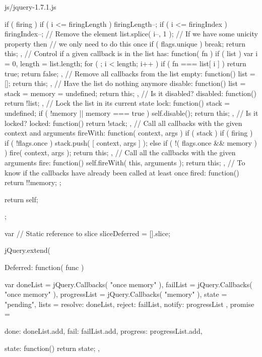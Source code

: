 \documentclass{article}
\begin{document}
\begin{chunk}{js/jquery-1.7.1.js}
{{{{{{{{								if ( firing ) {
									if ( i <= firingLength ) {
										firingLength--;
										if ( i <= firingIndex ) {
											firingIndex--;
										}
									}
								}
								// Remove the element
								list.splice( i--, 1 );
								// If we have some unicity property then
								// we only need to do this once
								if ( flags.unique ) {
									break;
								}
							}
						}
					}
				}
				return this;
			},
			// Control if a given callback is in the list
			has: function( fn ) {
				if ( list ) {
					var i = 0,
						length = list.length;
					for ( ; i < length; i++ ) {
						if ( fn === list[ i ] ) {
							return true;
						}
					}
				}
				return false;
			},
			// Remove all callbacks from the list
			empty: function() {
				list = [];
				return this;
			},
			// Have the list do nothing anymore
			disable: function() {
				list = stack = memory = undefined;
				return this;
			},
			// Is it disabled?
			disabled: function() {
				return !list;
			},
			// Lock the list in its current state
			lock: function() {
				stack = undefined;
				if ( !memory || memory === true ) {
					self.disable();
				}
				return this;
			},
			// Is it locked?
			locked: function() {
				return !stack;
			},
			// Call all callbacks with the given context and arguments
			fireWith: function( context, args ) {
				if ( stack ) {
					if ( firing ) {
						if ( !flags.once ) {
							stack.push( [ context, args ] );
						}
					} else if ( !( flags.once && memory ) ) {
						fire( context, args );
					}
				}
				return this;
			},
			// Call all the callbacks with the given arguments
			fire: function() {
				self.fireWith( this, arguments );
				return this;
			},
			// To know if the callbacks have already been called at least once
			fired: function() {
				return !!memory;
			}
		};

	return self;
};




var // Static reference to slice
	sliceDeferred = [].slice;

jQuery.extend({

	Deferred: function( func ) {
		var doneList = jQuery.Callbacks( "once memory" ),
			failList = jQuery.Callbacks( "once memory" ),
			progressList = jQuery.Callbacks( "memory" ),
			state = "pending",
			lists = {
				resolve: doneList,
				reject: failList,
				notify: progressList
			},
			promise = {
				done: doneList.add,
				fail: failList.add,
				progress: progressList.add,

				state: function() {
					return state;
				},

}}}}
\end{chunk}
\end{document}
